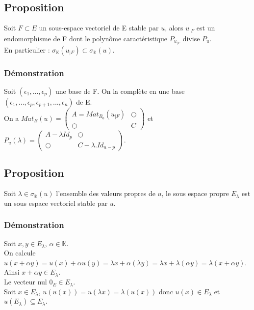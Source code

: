 \documentclass[a4paper,10pt]{book} %
\newcommand{\K}{\mathbb{K}}
\newcommand{\sev}{sous-espace vectoriel }
\begin{document}
\subsection{Proposition}
Soit $F\subset E$ un \sev de E stable par $u$, alors $u_{|F}$ est un endomorphisme de F dont le polynôme caractéristique $P_{u_{|F}}$ divise $P_u$.\\

En particulier : $\sigma_{\K}(u_{|F})\subset \sigma_{\K}(u)$.

\subsubsection{Démonstration}
Soit $(\epsilon_1,...,\epsilon_p)$ une base de F. On la complète en une base $(\epsilon_1,...,\epsilon_p,\epsilon_{p+1},...,\epsilon_n)$ de E.\\

On a
$Mat_B(u)=\begin{pmatrix}
A=Mat_{B_0}(u_{|F})&\bigcirc\\
\bigcirc&C
\end{pmatrix}$ et $P_u(\lambda)=\begin{pmatrix}
A-\lambda Id_p&\bigcirc\\
\bigcirc&C-\lambda.Id_{n-p}
\end{pmatrix}$.

\subsection{Proposition}
Soit $\lambda\in \sigma_\K(u)$ l'ensemble des valeurs propres de $u$, le sous espace propre $E_\lambda$ est un sous espace vectoriel stable par $u$.

\subsubsection{Démonstration}
Soit $x,y\in E_\lambda$, $\alpha\in \K$.\\

On calcule $u(x+\alpha y)=u(x)+\alpha u(y)=\lambda x+\alpha (\lambda y)=\lambda x+\lambda(\alpha y)=\lambda(x+\alpha y)$.\\

Ainsi $x+\alpha y\in E_\lambda$.\\

Le vecteur nul $0_E\in E_\lambda$.\\

Soit $x\in E_\lambda$, $u(u(x))=u(\lambda x)=\lambda(u(x))$ donc $u(x)\in E_\lambda$ et $u(E_\lambda)\subseteq E_\lambda$.
\end{document}
